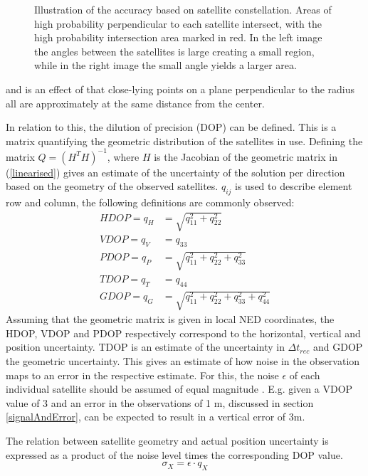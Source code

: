 \begin{figure}
\begin{minipage}[t]{0.38\textwidth}
\end{minipage}
\caption{\label{fig:DOPtheory} Illustration of the accuracy based on satellite constellation. Areas of high probability perpendicular to each satellite intersect, with the high probability intersection area marked in red. In the left image the angles between the satellites is large creating a small region, while in the right image the small angle yields a larger area.}
\end{figure}
and is an effect of that close-lying points on a plane perpendicular to the radius all are approximately at the same distance from the center. 
\par 
In relation to this, the dilution of precision (DOP) can be defined. This is a matrix quantifying the geometric distribution of the satellites in use. Defining the matrix $Q=(H^TH)^{-1}$, where $H$ is the Jacobian of the geometric matrix in (\ref{linearised}) gives an estimate of the uncertainty of the solution per direction based on the geometry of the observed satellites. $q_{ij}$ is used to describe element row and column, the following definitions are commonly observed:
\begin{align}
HDOP=q_H&=\sqrt{q_{11}^2+q_{22}^2}\label{eq:HDOP}\\ 
VDOP=q_V&=q_{33}\label{eq:VDOP}\\ 
PDOP=q_P&=\sqrt{q_{11}^2+q_{22}^2+q_{33}^2}\label{eq:PDOP}\\ 
TDOP=q_T&=q_{44}\label{eq:TDOP}\\ 
GDOP=q_G&=\sqrt{q_{11}^2+q_{22}^2+q_{33}^2+q_{44}^2} \label{eq:GDOP}
\end{align}
Assuming that the geometric matrix is given in local NED coordinates, the HDOP, VDOP and PDOP respectively correspond to the horizontal, vertical and position uncertainty. TDOP is an estimate of the uncertainty in $\Delta t_{rec}$ and GDOP the geometric uncertainty. This gives an estimate of how noise in the observation maps to an error in the respective estimate. For this, the noise $\epsilon$ of each individual satellite should be assumed of equal magnitude \cite{tahsin2015analysis}. E.g. given a VDOP value of 3 and an error in the observations of 1 m, discussed in section \ref{signalAndError}, can be expected to result in a vertical error of 3m.
\par
The relation between satellite geometry and actual position uncertainty is expressed as a product of the noise level times the corresponding DOP value. 
\begin{equation}\label{UERE}
\sigma_X=\epsilon\cdot q_X
\end{equation}
